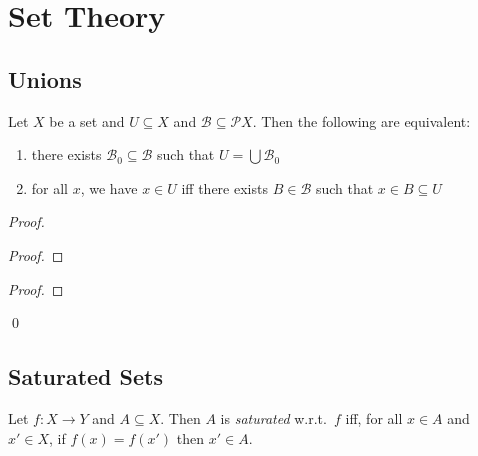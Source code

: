 \newcommand{\finsubseteq}{\ensuremath{\subseteq^{\mathrm{fin}}}}

\chapter{Set Theory}

\section{Unions}

\begin{prop}
  \label{prop:set_theory:unions}
  Let $X$ be a set and $U \subseteq X$ and $\mathcal{B} \subseteq \mathcal{P} X$. Then the following are equivalent:
  \begin{enumerate}
    \item there exists $\mathcal{B}_0 \subseteq \mathcal{B}$ such that $U = \bigcup \mathcal{B}_0$
    \item for all $x$, we have $x \in U$ iff there exists $B \in \mathcal{B}$ such that $x \in B \subseteq U$
  \end{enumerate}
\end{prop}

\begin{proof}
  \pf
  \begin{proof}
  \end{proof}
  \begin{proof}
  \end{proof}
  \qed
\end{proof}

\section{Saturated Sets}

\begin{df}
  Let $f : X \rightarrow Y$ and $A \subseteq X$. Then $A$ is \emph{saturated} w.r.t.~$f$ iff, for all $x \in A$ and $x' \in X$, if $f(x) = f(x')$ then $x' \in A$.
\end{df}

